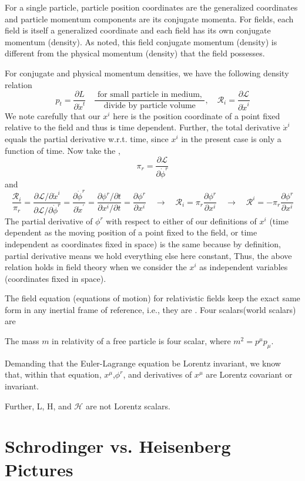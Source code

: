 For a single particle, particle position coordinates are the generalized coordinates and particle momentum components are its conjugate momenta. For fields, each field is itself a generalized coordinate and each field has its own conjugate momentum (density). As noted, this field conjugate momentum (density) is different from the physical momentum (density) that the field possesses.

For conjugate and physical momentum densities, we have the following density relation
$$
p_{t}=\frac{\partial L}{\partial \dot{x}^{t}} \quad \frac{\text { for small particle in medium, }}{\text { divide by particle volume }}, \quad \mathcal{R}_{i}=\frac{\partial \mathcal{L}}{\partial \dot{x}^{i}}
$$
We note carefully that our $x^i$ here is the position coordinate of a point fixed relative to the field and thus is time dependent. Further, the total derivative $\dot{x}^i$ equals the partial derivative w.r.t. time, since $x^i$ in the present case is only a function of time. Now take the ,
$$
\pi_{r}=\frac{\partial \mathcal{L}}{\partial \dot{\phi}^{r}}
$$
and
$$
\frac{\mathcal{R}_{i}}{\pi_{r}}=\frac{\partial \mathcal{L} / \partial \dot{x}^{i}}{\partial \mathcal{L} / \partial \dot{\phi}^{r}}=\frac{\partial \dot{\phi}^{r}}{\partial \dot{x}^{\prime}}=\frac{\partial \phi^{r} / \partial t}{\partial x^{i} / \partial t}=\frac{\partial \phi^{r}}{\partial x^{i}} \quad \rightarrow \quad \mathcal{R}_{i}=\pi_{r} \frac{\partial \phi^{r}}{\partial x^{i}} \quad \rightarrow \quad \mathcal{R}^{i}=-\pi_{r} \frac{\partial \phi^{r}}{\partial x^{i}}
$$
The partial derivative of $\phi^{r}$ with respect to either of our definitions of $x^{i}$ (time dependent as the moving position of a point fixed to the field, or time independent as coordinates fixed in space) is the same because by definition, partial derivative means we hold everything else here constant, Thus, the above relation holds in field theory when we consider the $x^{i}$ as independent variables (coordinates fixed in space).

The field equation (equations of motion) for relativistic fields keep the exact same form in any inertial frame of reference, i.e., they are . Four scalars(world scalars) are 
\begin{qt}
The mass $m$ in relativity of a free particle is four scalar, where $m^2=p^{\mu}p_{\mu}$.

Demanding that the Euler-Lagrange equation be Lorentz invariant, we know that, within that equation, $x^{\mu}$,$\phi^r$, and derivatives of $x^{\mu}$ are Lorentz covariant or invariant. 

Further, L, H, and $\mathcal{H}$ are not Lorentz scalars.
\end{qt}

\section{Schrodinger vs. Heisenberg Pictures}
